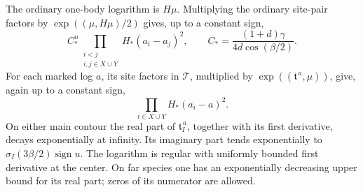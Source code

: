 \begin{lemma}
\label{lem:06-magnetic-mean}
The ordinary one-body logarithm is \(H\mu\).
Multiplying the ordinary site-pair factors by
\(\exp((\mu,H\mu)/2)\) gives, up to a constant sign,
\begin{equation}
 C_*^n\prod_{\substack{i<j\\i,j\in X\cup Y}}H_*(a_i-a_j)^2,
 \qquad
 C_*=\frac{(1+d)\gamma}{4d\cos(\beta/2)}.
 \label{eq:06-ordinary-mean}
\end{equation}
For each marked log \(a\), its site factors in \(\mathcal T\),
multiplied by \(\exp((\mathfrak t^{\,a},\mu))\), give, again up to
a constant sign,
\begin{equation}
 \prod_{i\in X\cup Y}H_*(a_i-a)^2.
 \label{eq:06-marked-mean}
\end{equation}
On either main contour the real part of
\(\mathfrak t_I^{\,a}\), together with its first derivative, decays
exponentially at infinity.  Its imaginary part tends exponentially
to
\(\sigma_I(3\beta/2)\operatorname{sign}u\).
The logarithm is regular with uniformly bounded first derivative
at the center.  On far species one has an exponentially decreasing
upper bound for its real part; zeros of its numerator are allowed.
\end{lemma}

